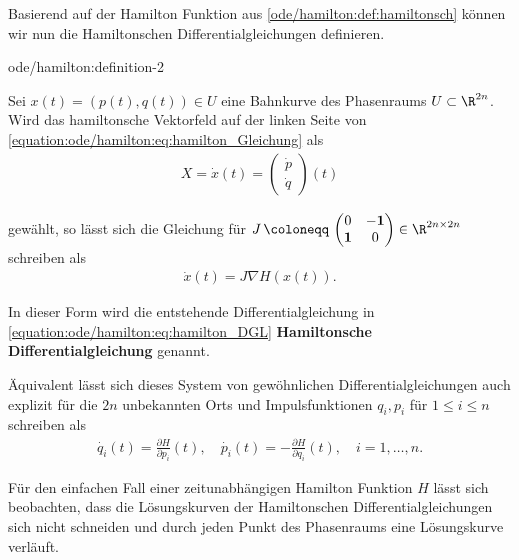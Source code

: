 \documentclass[letterpaper,10pt,english]{jupyterBook}
\begin{document}
\par
Basierend auf der Hamilton Funktion aus \cref{ode/hamilton:def:hamiltonsch} können wir nun die Hamiltonschen Differentialgleichungen definieren.
\begin{definition}{}{ode/hamilton:definition-2}



\par
Sei \(x(t) = (p(t),q(t)) \in U\) eine Bahnkurve des Phasenraums \(U \subset \R^{2n}\).
Wird das hamiltonsche Vektorfeld auf der linken Seite von \eqref{equation:ode/hamilton:eq:hamilton_Gleichung} als
\begin{align*}
X = \dot{x}(t) = \begin{pmatrix} \dot{p} \\ \dot{q} \end{pmatrix} (t)
\end{align*}
\par
gewählt, so lässt sich die Gleichung für \(J \, \coloneqq \, \begin{pmatrix}0 & -\mathbf{1}\\ \mathbf{1} & 0 \end{pmatrix} \in \R^{2n \times 2n}\) schreiben als
\begin{align}\label{equation:ode/hamilton:eq:hamilton_DGL}
\dot{x}(t) = J \nabla H(x(t)).
\end{align}
\par
In dieser Form wird die entstehende Differentialgleichung in \eqref{equation:ode/hamilton:eq:hamilton_DGL} \textbf{Hamiltonsche Differentialgleichung} genannt.

\par
Äquivalent lässt sich dieses System von gewöhnlichen Differentialgleichungen auch explizit für die \(2n\) unbekannten Orts  und Impulsfunktionen \(q_i, p_i\) für \(1 \leq i \leq n\) schreiben als
\begin{align*}
\dot{q_i}(t) = \frac{\partial H}{\partial p_i}(t), \quad \dot{p_i}(t) = -\frac{\partial H}{\partial q_i}(t), \quad i=1,\ldots,n.
\end{align*}\end{definition}

\par
Für den einfachen Fall einer zeitunabhängigen Hamilton Funktion \(H\) lässt sich beobachten, dass die Lösungskurven der Hamiltonschen Differentialgleichungen sich nicht schneiden und durch jeden Punkt des Phasenraums eine Lösungskurve verläuft.
\end{document}
